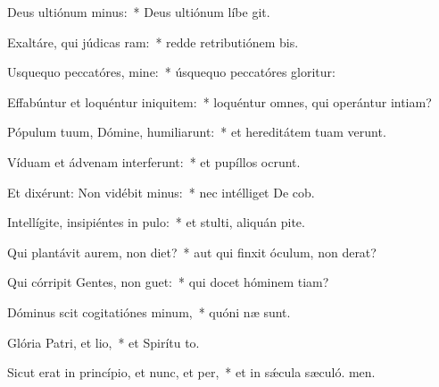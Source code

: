 \item Deus ultiónum minus:~* Deus ultiónum líbe git.
\item Exaltáre, qui júdicas ram:~* redde retributiónem bis.
\item Usquequo peccatóres, mine:~* úsquequo peccatóres gloritur:
\item Effabúntur et loquéntur iniquitem:~* loquéntur omnes, qui operántur intiam?
\item Pópulum tuum, Dómine, humiliarunt:~* et hereditátem tuam verunt.
\item Víduam et ádvenam interferunt:~* et pupíllos ocrunt.
\item Et dixérunt: Non vidébit minus:~* nec intélliget De cob.
\item Intellígite, insipiéntes in pulo:~* et stulti, aliquán pite.
\item Qui plantávit aurem, non diet?~* aut qui finxit óculum, non derat?
\item Qui córripit Gentes, non guet:~* qui docet hóminem tiam?
\item Dóminus scit cogitatiónes minum,~* quóni næ sunt.
\item Glória Patri, et lio,~* et Spirítu to.
\item Sicut erat in princípio, et nunc, et per,~* et in sǽcula sæculó. men.
